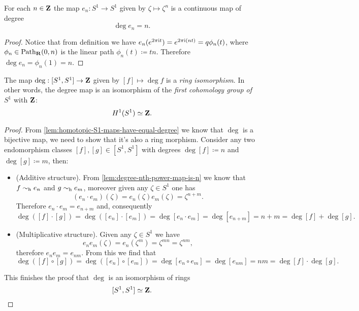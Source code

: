 \begin{lemma}
    \label{lem:degree-nth-power-map-is-n}
    For each \(n \in \mathbf{Z}\) the map \(e_n: S^1 \to S^1\) given by \(\zeta \mapsto
    \zeta^n\) is a continuous map of degree
    \[
        \deg e_n = n.
    \]
\end{lemma}

\begin{proof}
    Notice that from definition we have \(e_n(e^{2 \pi \text{i} t}) = e^{2 \pi \text{i} (n
            t)} = q \phi_n(t)\), where \(\phi_n \in \operatorname{Path}_{\mathbf{R}}(0, n)\) is the linear path
    \(\phi_n(t) \coloneq t n\). Therefore \(\deg e_n = \phi_n(1) = n\).
\end{proof}

\begin{theorem}
    \label{thm:deg-is-ring-isomorphis}
    The map \(\deg: [S^1, S^1] \to \mathbf{Z}\) given by \([f] \mapsto \deg f\) is a
    \emph{ring isomorphism}. In other words, the degree map is an isomorphism of the
    \emph{first cohomology group of \(S^1\)} with \(\mathbf{Z}\):
    \[
        H^1(S^1) \simeq \mathbf{Z}.
    \]
\end{theorem}

\begin{proof}
    From \cref{lem:homotopic-S1-maps-have-equal-degree} we know that \(\deg\) is a
    bijective map, we need to show that it's also a ring morphism. Consider any two
    endomorphism classes \([f], [g] \in [S^1, S^1]\) with degrees \(\deg [f]
    \coloneq n\) and \(\deg [g] \coloneq m\), then:
    \begin{itemize}\setlength\itemsep{0em}
        \item (Additive structure). From \cref{lem:degree-nth-power-map-is-n} we know
              that \(f \sim_{\text{h}} e_n\) and \(g \sim_{\text{h}} e_m\), moreover given any
              \(\zeta \in S^1\) one has
              \[
                  (e_n \cdot e_m)(\zeta) = e_n(\zeta) e_m(\zeta) = \zeta^{n + m}.
              \]
              Therefore \(e_n \cdot e_m = e_{n + m}\) and, consequently
              \[
                  \deg([f] \cdot [g])
                  = \deg([e_n] \cdot [e_m])
                  = \deg [e_n \cdot e_m]
                  = \deg [e_{n+m}]
                  = n + m
                  = \deg [f] + \deg [g].
              \]

        \item (Multiplicative structure). Given any \(\zeta \in S^1\) we have
              \[
                  e_n e_m(\zeta) = e_n(\zeta^m) = \zeta^{m n} = \zeta^{n m},
              \]
              therefore \(e_n e_m = e_{n m}\). From this we find that
              \[
                  \deg([f] \circ [g])
                  = \deg([e_n] \circ [e_m])
                  = \deg [e_n \circ e_m]
                  = \deg [e_{n m}]
                  = n m
                  = \deg [f] \cdot \deg [g].
              \]
    \end{itemize}
    This finishes the proof that \(\deg\) is an isomorphism of rings
    \[
        [S^1, S^1] \simeq \mathbf{Z}.
    \]
\end{proof}

